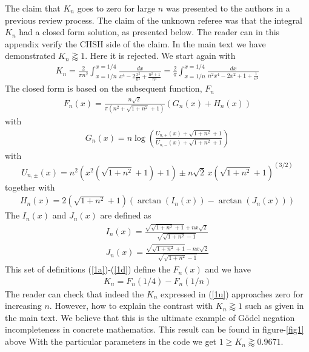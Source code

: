 \documentclass{appolb}
\begin{document}
The claim that $K_n$ goes to zero for large $n$ was presented to the authors in a previous review process. The claim of the unknown referee was that the integral $K_n$ had a closed form solution, as presented below. 
The reader can in this appendix verify the CHSH side of the claim. In the main text we have demonstrated $K_n\gtrapprox 1$. Here it is rejected.
We start again with
\begin{eqnarray}\label{1}
K_n = \frac{2}{\pi n^2} \int_{x=1/n}^{x=1/4}\frac{dx}{x^4-2\frac{x^2}{n^2}+\frac{n^2 +1}{n^4}} = \frac{2}{\pi} \int_{x=1/n}^{x=1/4} \frac{dx}{n^2x^4-2x^2+1+\frac{1}{n^2}}
\end{eqnarray}
The closed form is based on the subsequent function, $F_n$
\begin{eqnarray}\label{1a}
F_n(x)=\frac{n\sqrt{2}}{\pi(n^2+\sqrt{1+n^2} +1)}(G_n(x)+H_n(x))
\end{eqnarray}
with
\begin{eqnarray}\label{1b}
G_n(x)=n \log\left( \frac{U_{n,+}(x) +\sqrt{1+n^2}+1}{U_{n,-}(x)+\sqrt{1+n^2}+1}\right)
\end{eqnarray}
with
\[
U_{n,\pm}(x)=
{n^2(x^2(\sqrt{1+n^2} +1)+1)\pm n\sqrt{2}\, x \left(\sqrt{1+n^2}+1\right)^{(3/2)}}
\]
together with
\begin{eqnarray}\label{1c}
H_n(x)=2(\sqrt{1+n^2}+1)(\arctan(I_n(x))-\arctan(J_n(x)))
\end{eqnarray}
The $I_n(x)$ and $J_n(x)$ are defined as
\begin{eqnarray}\label{1d}
I_n(x)=\frac
{\sqrt{\sqrt{1+n^2}+1}+nx\sqrt{2}}{\sqrt{\sqrt{1+n^2}-1}}\\\nonumber
J_n(x)=\frac
{\sqrt{\sqrt{1+n^2}+1}-nx\sqrt{2}}{\sqrt{\sqrt{1+n^2}-1}}
\end{eqnarray}
This set of definitions (\ref{1a})-(\ref{1d}) define the $F_n(x)$ and we have 
\begin{eqnarray}\label{1u}
K_n=F_n(1/4)-F_n(1/n)
\end{eqnarray}
The reader can check that indeed the $K_n$ expressed in (\ref{1u}) approaches zero for increasing $n$. However, how to explain the contrast with $K_n\gtrapprox 1$ such as given in the main text.
We believe that this is the ultimate example of G{\"o}del negation incompleteness in concrete mathematics. 
\newpage
{} 
This result can be found in figure-\ref{fig1} above
With the particular parameters in the code we get $1\geq K_n \gtrapprox 0.9671$.
\end{document}
